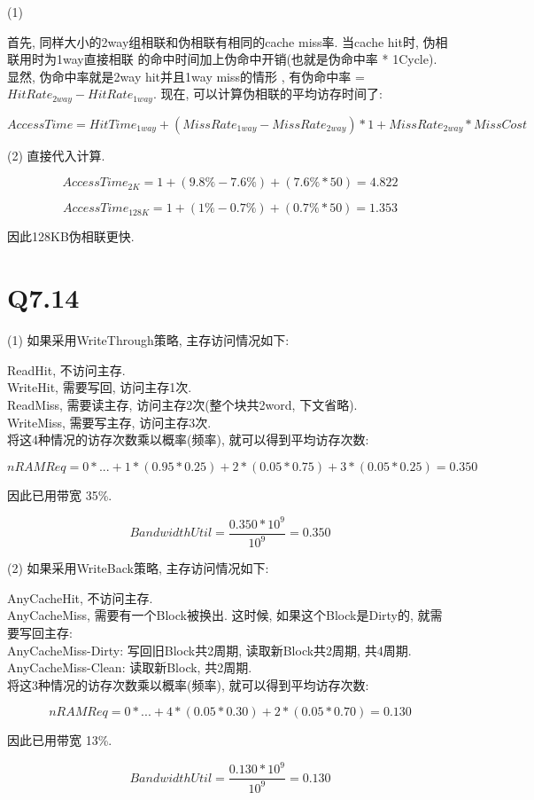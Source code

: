 \documentclass{article}
\begin{document}
\begin{CJK}{UTF8}{gbsn}
(1)

首先, 同样大小的2way组相联和伪相联有相同的cache miss率. 当cache hit时, 伪相联用时为1way直接相联
的命中时间加上伪命中开销(也就是伪命中率 * 1Cycle). \\ 显然, 伪命中率就是2way hit并且1way miss的情形
, 有伪命中率 = $HitRate_{2way} - HitRate_{1way}$. 现在, 可以计算伪相联的平均访存时间了:

$$ AccessTime = HitTime_{1way} + (MissRate_{1way} - MissRate_{2way}) * 1 + MissRate_{2way} * MissCost $$

(2) 直接代入计算.

$$AccessTime_{2K} = 1 + (9.8\%-7.6\%) + (7.6\%*50) = 4.822$$

$$AccessTime_{128K} = 1 + (1\%-0.7\%) + (0.7\%*50) = 1.353$$

因此128KB伪相联更快.

\section{Q7.14}
\Large
\smallskip

(1) 如果采用WriteThrough策略, 主存访问情况如下:

ReadHit, 不访问主存.\\
WriteHit, 需要写回, 访问主存1次.\\
ReadMiss, 需要读主存, 访问主存2次(整个块共2word, 下文省略).\\
WriteMiss, 需要写主存, 访问主存3次.\\

将这4种情况的访存次数乘以概率(频率), 就可以得到平均访存次数:

$$nRAMReq = 0*... + 1*(0.95*0.25) + 2*(0.05*0.75) + 3*(0.05*0.25) = 0.350$$

因此已用带宽 35\%.

$$BandwidthUtil = \frac{0.350*10^9}{10^9} = 0.350$$

(2) 如果采用WriteBack策略, 主存访问情况如下:

AnyCacheHit, 不访问主存.\\
AnyCacheMiss, 需要有一个Block被换出. 这时候, 如果这个Block是Dirty的, 就需要写回主存:\\
AnyCacheMiss-Dirty: 写回旧Block共2周期, 读取新Block共2周期, 共4周期.\\
AnyCacheMiss-Clean: 读取新Block, 共2周期.\\

将这3种情况的访存次数乘以概率(频率), 就可以得到平均访存次数:

$$nRAMReq = 0*... + 4*(0.05*0.30) + 2*(0.05*0.70) = 0.130$$

因此已用带宽 13\%.

$$BandwidthUtil = \frac{0.130*10^9}{10^9} = 0.130$$


\end{CJK}
\end{document}
